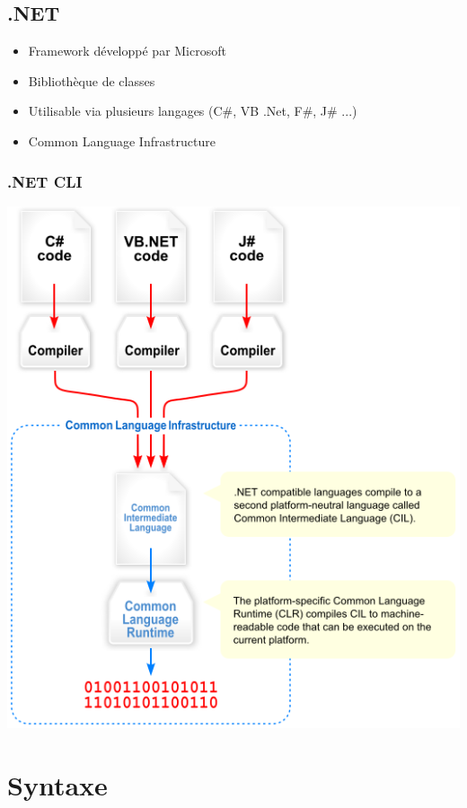 \documentclass{beamer}
\begin{document}
\subsection{.NET}

\begin{frame}
\begin{itemize}
\frametitle{.NET}
\item Framework développé par Microsoft
\item Bibliothèque de classes
\item Utilisable via plusieurs langages (C\#, VB .Net, F\#, J\# ...)
\item Common Language Infrastructure
\end{itemize}
\end{frame}

\begin{frame}
\begin{center}
\frametitle{.NET CLI}
\includegraphics[scale=0.38]{img/cli.png}
\end{center}
\end{frame}

\section{Syntaxe}
\end{document}
